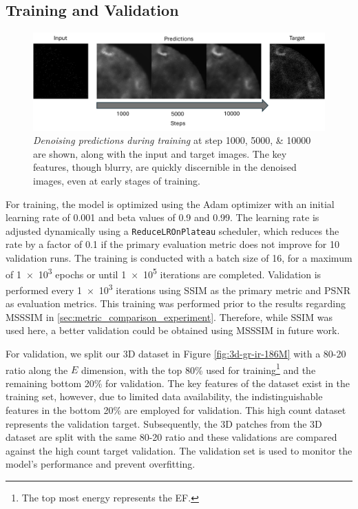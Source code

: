 \subsection{Training and Validation}
\begin{figure}
    \centering
    \includegraphics[width=1\linewidth]{images/training_progress_example2.pdf}
    \caption{\textit{Denoising predictions during training} at step \numlist{1000;5000;10000} are shown, along with the input and target images. The key features, though blurry, are quickly discernible in the denoised images, even at early stages of training.}
    \label{fig:training-progress-example}
\end{figure}
For training, the model is optimized using the Adam optimizer with an initial learning rate of \num{0.001} and beta values of \num{0.9} and \num{0.99}. The learning rate is adjusted dynamically using a \texttt{ReduceLROnPlateau} scheduler, which reduces the rate by a factor of \num{0.1} if the primary evaluation metric does not improve for \num{10} validation runs. The training is conducted with a batch size of \num{16}, for a maximum of \num{1e3} epochs or until \num{1e5} iterations are completed. Validation is performed every \num{1e3} iterations using \gls{SSIM} as the primary metric and \gls{PSNR} as evaluation metrics. This training was performed prior to the results regarding \gls{MSSSIM} in \cref{sec:metric_comparison_experiment}. Therefore, while \gls{SSIM} was used here, a better validation could be obtained using \gls{MSSSIM} in future work.

For validation, we split our 3D dataset in Figure \cref{fig:3d-gr-ir-186M} with a 80-20 ratio along the $E$ dimension, with the top 80\% used for training\footnote{The top most energy represents the \gls{EF}.} and the remaining bottom 20\% for validation. The key features of the dataset exist in the training set, however, due to limited data availability, the indistinguishable features in the bottom 20\% are employed for validation. This high count dataset represents the validation target. Subsequently, the 3D patches from the 3D dataset are split with the same 80-20 ratio and these validations are compared against the high count target validation. The validation set is used to monitor the model's performance and prevent overfitting. 

